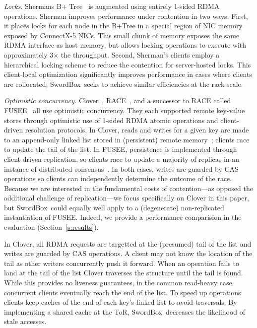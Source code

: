\documentclass[12pt]{ucsddissertation}
\newcommand{\sword}{SwordBox}
\begin{document}
\emph{Locks.} Shermans B+ Tree~\cite{sherman} is augmented using entirely 1-sided RDMA operations. Sherman improves
performance under contention in two ways. First, it places locks for each node in the B+Tree in a
special region of NIC memory exposed by ConnectX-5 NICs.  This small chunk of memory exposes the
same RDMA interface as host memory, but allows locking operations to execute with approximately
3$\times$ the throughput.  Second, Sherman's clients employ a hierarchical locking scheme to reduce
the contention for server-hosted locks.  This client-local optimization significantly improves
performance in cases where clients are collocated; \sword\ seeks to achieve similar efficiencies at
the rack scale.


\emph{Optimistic concurrency.}  Clover~\cite{clover}, RACE~\cite{race}, and a successor to RACE
called FUSEE~\cite{fusee} all use optimistic concurrency.  They each supported remote key-value
stores through optimistic use of
1-sided RDMA atomic operations and client-driven resolution protocols. 
In Clover, reads and writes for a given key are made to an append-only linked list stored in
(persistent) remote memory~\cite{clover}; clients race to update the tail of the list.  In FUSEE,
persistence is implemented through client-driven replication, so clients race to update a majority
of replicas in an instance of distributed consensus~\cite{fusee}.  In both cases, writes are guarded
by CAS operations so clients can independently determine the outcome of the race.  Because we are
interested in the fundamental costs of contention---as opposed the additional challenge of
replication---we focus specifically on Clover in this paper, but \sword\ could equally well apply to
a (degenerate) non-replicated instantiation of FUSEE.  Indeed, we provide a performance comparision
in the evaluation (Section~\ref{s:results}).

In Clover, all RDMA requests are targetted at the (presumed) tail of the list and writes are guarded
by CAS operations. A client may not know the location of the tail as other writers concurrently push
it forward. When an operation fails to land at the tail of the list Clover traverses the structure
until the tail is found. While this provides no liveness guarantees, in the common read-heavy case
concurrent clients eventually reach the end of the list. To speed up operations clients keep caches
of the end of each key's linked list to avoid traversals.  By implementing a shared cache at the
ToR, \sword\ decreases the likelihood of stale accesses.
\end{document}
